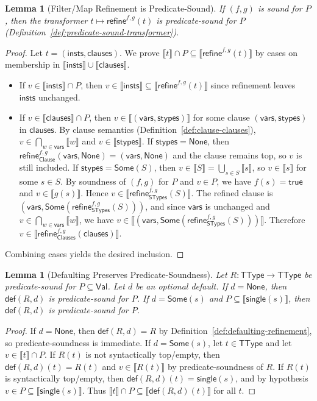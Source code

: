 \documentclass[11pt]{article}
\newtheorem{lemma}[theorem]{Lemma}
\newcommand{\sem}[1]{\llbracket #1 \rrbracket}
\newcommand{\refineop}{\mathsf{refine}}
\newcommand{\TType}{\mathsf{TType}}
\newcommand{\Clauses}{\mathsf{Clauses}}
\newcommand{\Clause}{\mathsf{Clause}}
\newcommand{\STypes}{\mathsf{STypes}}
\newcommand{\vars}{\mathsf{vars}}
\newcommand{\stypes}{\mathsf{stypes}}
\newcommand{\insts}{\mathsf{insts}}
\newcommand{\clauses}{\mathsf{clauses}}
\newcommand{\Val}{\mathsf{Val}}
\begin{document}
\begin{lemma}[Filter/Map Refinement is Predicate-Sound]
\label{lem:filter-map-predicate-sound}
If $(f,g)$ is sound for $P$, then the transformer $t \mapsto \refineop^{f,g}(t)$ is predicate-sound for $P$ (Definition~\ref{def:predicate-sound-transformer}).
\end{lemma}

\begin{proof}
Let $t=(\insts,\clauses)$.
We prove $\sem{t}\cap P \subseteq \sem{\refineop^{f,g}(t)}$ by cases on membership in $\sem{\insts} \cup \sem{\clauses}$.
\begin{itemize}
\item If $v \in \sem{\insts}\cap P$, then $v \in \sem{\insts} \subseteq \sem{\refineop^{f,g}(t)}$ since refinement leaves $\insts$ unchanged.
\item If $v \in \sem{\clauses}\cap P$, then $v \in \sem{(\vars,\stypes)}$ for some clause $(\vars,\stypes)$ in $\clauses$.
By clause semantics (Definition~\ref{def:clause-clauses}), $v \in \bigcap_{w \in \vars} \sem{w}$ and $v \in \sem{\stypes}$.
If $\stypes=\mathsf{None}$, then $\refineop_{\Clause}^{f,g}(\vars,\mathsf{None})=(\vars,\mathsf{None})$ and the clause remains top, so $v$ is still included.
If $\stypes=\mathsf{Some}(S)$, then $v \in \sem{S} = \bigcup_{s \in S} \sem{s}$, so $v \in \sem{s}$ for some $s \in S$.
By soundness of $(f,g)$ for $P$ and $v\in P$, we have $f(s)=\mathsf{true}$ and $v\in \sem{g(s)}$.
Hence $v \in \sem{\refineop_{\STypes}^{f,g}(S)}$.
The refined clause is $(\vars, \mathsf{Some}(\refineop_{\STypes}^{f,g}(S)))$, and since $\vars$ is unchanged and $v \in \bigcap_{w \in \vars} \sem{w}$, we have $v \in \sem{(\vars, \mathsf{Some}(\refineop_{\STypes}^{f,g}(S)))}$.
Therefore $v \in \sem{\refineop_{\Clauses}^{f,g}(\clauses)}$.
\end{itemize}
Combining cases yields the desired inclusion.
\end{proof}

\begin{lemma}[Defaulting Preserves Predicate-Soundness]
\label{lem:defaulting-preserves-predicate-sound}
Let $R:\TType \to \TType$ be predicate-sound for $P \subseteq \Val$.
Let $d$ be an optional default.
If $d=\mathsf{None}$, then $\mathsf{def}(R,d)$ is predicate-sound for $P$.
If $d=\mathsf{Some}(s)$ and $P \subseteq \sem{\mathsf{single}(s)}$, then $\mathsf{def}(R,d)$ is predicate-sound for $P$.
\end{lemma}

\begin{proof}
If $d=\mathsf{None}$, then $\mathsf{def}(R,d)=R$ by Definition~\ref{def:defaulting-refinement}, so predicate-soundness is immediate.
If $d=\mathsf{Some}(s)$, let $t \in \TType$ and let $v \in \sem{t}\cap P$.
If $R(t)$ is not syntactically top/empty, then $\mathsf{def}(R,d)(t)=R(t)$ and $v \in \sem{R(t)}$ by predicate-soundness of $R$.
If $R(t)$ is syntactically top/empty, then $\mathsf{def}(R,d)(t)=\mathsf{single}(s)$, and by hypothesis $v \in P \subseteq \sem{\mathsf{single}(s)}$.
Thus $\sem{t}\cap P \subseteq \sem{\mathsf{def}(R,d)(t)}$ for all $t$.
\end{proof}
\end{document}
